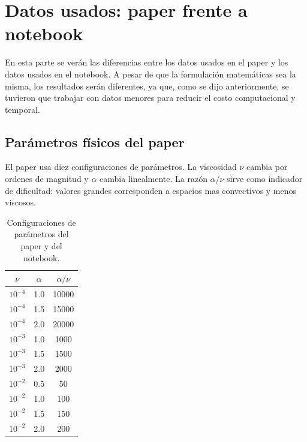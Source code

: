 \documentclass[10pt,letterpaper,twocolumn]{article}
\begin{document}
\section{Datos usados: paper frente a notebook}

En esta parte se verán las diferencias entre los datos usados en el paper y los datos usados en el notebook. A pesar de que la formulación matemáticas sea la misma, los resultados serán diferentes, ya que, como se dijo anteriormente, se tuvieron que trabajar con datos menores para reducir el costo computacional y temporal.

\subsection{Parámetros físicos del paper}

El paper usa diez configuraciones de parámetros. La viscosidad $\nu$ cambia por ordenes de magnitud y $\alpha$ cambia linealmente. La razón $\alpha/\nu$ sirve como indicador de dificultad: valores grandes corresponden a espacios mas convectivos y menos viscosos.

\begin{table}[H]
\centering
\caption{Configuraciones de parámetros del paper y del notebook.}
\begin{tabular}{ccc}
\toprule
$\nu$ & $\alpha$ & $\alpha/\nu$ \\
\midrule
$10^{-4}$ & 1.0 & 10000 \\
$10^{-4}$ & 1.5 & 15000 \\
$10^{-4}$ & 2.0 & 20000 \\
$10^{-3}$ & 1.0 & 1000 \\
$10^{-3}$ & 1.5 & 1500 \\
$10^{-3}$ & 2.0 & 2000 \\
$10^{-2}$ & 0.5 & 50 \\
$10^{-2}$ & 1.0 & 100 \\
$10^{-2}$ & 1.5 & 150 \\
$10^{-2}$ & 2.0 & 200 \\
\bottomrule
\end{tabular}
\end{table}
\end{document}
